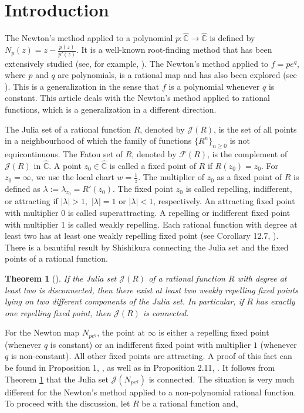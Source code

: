 \documentclass[12pt]{article}
\newtheorem{thm}{Theorem}[section]
\numberwithin{equation}{section}
\begin{document}
\section{Introduction}
The Newton's method  applied to a polynomial $p: \widehat{\mathbb{C}} \to  \widehat{\mathbb{C}}$ is defined by $N_p(z)=z-\frac{p(z)}{p'(z)}.$
It is a well-known root-finding method that has been extensively studied (see, for example, \cite{DrachSchleicher2022,HSS2001,przy-1989,lei}). The Newton's method applied to $f = pe^q$, where $p$ and $q$ are polynomials,  is a rational map and has also been explored (see \cite{Haruta1999,Mamayusupov2019,scl}). This is a generalization in the sense that $f$ is a polynomial whenever $q$ is constant. This article deals with the Newton's method applied to rational functions, which is a generalization in a different direction.
\par 
 The Julia set of a rational function $R$, denoted by $\mathcal{J}(R)$,  is the set of all points in a neighbourhood of which the family of functions $\{R^n\}_{n \geq 0}$ is not equicontinuous. The Fatou set of $R$, denoted by $\mathcal{F}(R)$, is the complement of $\mathcal{J}(R)$ in $\widehat{\mathbb{C}}$.  A point $z_0 \in \widehat{\mathbb{C}}$ is called a fixed point of $R$ if $R(z_0)=z_0$. For $z_0= \infty$, we use the local chart $w=\frac{1}{z}$. The multiplier of $z_0$ as a fixed point of $R$ is defined as $\lambda :=\lambda_{z_0}=R'(z_0)$.
 The fixed point $z_0$ is called repelling, indifferent, or attracting if $|\lambda|>1,$ $|\lambda| =1$ or $|\lambda|<1$, respectively. An attracting fixed point with multiplier $0$ is called superattracting. A  repelling or indifferent fixed point with multiplier $1$  is called weakly repelling. Each rational function with degree at least two has at least one weakly repelling fixed point (see Corollary 12.7, \cite{Milnor_book}). There is a beautiful result by Shishikura connecting the Julia set and the fixed points of a rational function.
 \begin{thm}[\cite{Shishikura2009}]
If the Julia set $\mathcal{J}(R)$ of a rational function $R$ with degree at least two is disconnected, then there exist at least two weakly repelling fixed points lying on two different components of the Julia set. In particular, if $R$ has exactly one repelling fixed point, then $\mathcal{J}(R)$ is connected.
 	\label{shishikura}
 \end{thm}
 For the Newton map $N_{p e^q}$, the point at $\infty$ is either a repelling fixed point (whenever $q$ is constant) or an indifferent fixed point with multiplier $1$ (whenever $q$ is non-constant). All other fixed points are attracting. A proof of this fact can be found in  Proposition 1, \cite{Haruta1999}, as well as in Proposition 2.11, \cite{scl}. It follows from Theorem \ref{shishikura} that the Julia set $\mathcal{J}(N_{p e^q})$ is connected. The situation is very much different for the Newton's method applied to a  non-polynomial rational function. To proceed with the discussion, let $R$ be a rational function and, 
\end{document}
